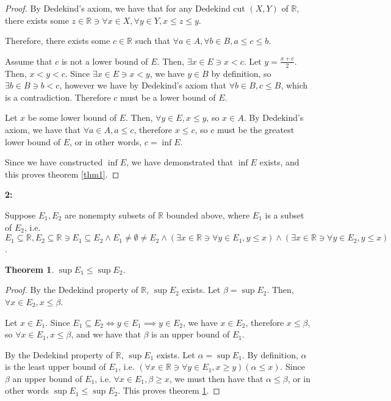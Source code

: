 \documentclass{article}
\newcommand{\reals}{\mathbb{R}}
\newtheorem{thm}{Theorem}
\begin{document}
\begin{proof}
	By Dedekind's axiom,
	we have that for any Dedekind cut $(X,Y)$ of $\reals$,
	there exists some $z \in \reals \ni \forall x \in X, \forall y \in Y, x \le z \le y$.

	Therefore, there exists some $c \in \reals$
	such that $\forall a \in A, \forall b \in B, a \le c \le b$.

	Assume that $c$ is not a lower bound of $E$.
	Then, $\exists x \in E \ni x < c$.
	Let $y = \frac{x + c}{2}$.
	Then, $x < y < c$.
	Since $\exists x \in E \ni x < y$,
	we have $y \in B$ by definition,
	so $\exists b \in B \ni b < c$,
	however we have by Dedekind's axiom
	that $\forall b \in B, c \le B$,
	which is a contradiction.
	Therefore $c$ must be a lower bound of $E$.

	Let $x$ be some lower bound of $E$.
	Then, $\forall y \in E, x \le y$, so $x \in A$.
	By Dedekind's axiom, we have that
	$\forall a \in A, a \le c$,
	therefore $x \le c$,
	so $c$ must be the greatest lower bound of $E$,
	or in other words, $c = \inf E$.

	Since we have constructed $\inf E$,
	we have demonstrated that $\inf E$ exists,
	and this proves theorem \ref{thm1}.

\end{proof}

\medskip
\textbf{2:}

Suppose $E_1, E_2$ are nonempty subsets of $\reals$ bounded above, where $E_1$ is a subset of $E_2$,
i.e. $E_1 \subseteq \reals, E_2 \subseteq \reals \ni E_1 \subseteq E_2 \land E_1 \neq \emptyset \neq E_2
\land (\exists x \in \reals \ni \forall y \in E_1, y \le x)
\land (\exists x \in \reals \ni \forall y \in E_2, y \le x)$.

\begin{thm} \label{thm2}
	$\sup E_1 \le \sup E_2$.
\end{thm}

\begin{proof}
	By the Dedekind property of $\reals$,
	$\sup E_2$ exists.
	Let $\beta = \sup E_2$.
	Then, $\forall x \in E_2, x \le \beta$.

	Let $x \in E_1$.
	Since $E_1 \subseteq E_2 \iff y \in E_1 \implies y \in E_2$,
	we have $x \in E_2$,
	therefore $x \le \beta$,
	so $\forall x \in E_1, x \le \beta$,
	and we have that $\beta$ is an upper bound of $E_1$.

	By the Dedekind property of $\reals$,
	$\sup E_1$ exists.
	Let $\alpha = \sup E_1$.
	By definition, $\alpha$ is the least upper bound of $E_1$,
	i.e. $(\forall x \in \reals \ni \forall y \in E_1, x \geq y)(\alpha \le x)$.
	Since $\beta$ an upper bound of $E_1$, i.e. $\forall x \in E_1, \beta \geq x$,
	we must then have that $\alpha \le \beta$,
	or in other words $\sup E_1 \le \sup E_2$.
	This proves theorem \ref{thm2}.
\end{proof}
\end{document}
